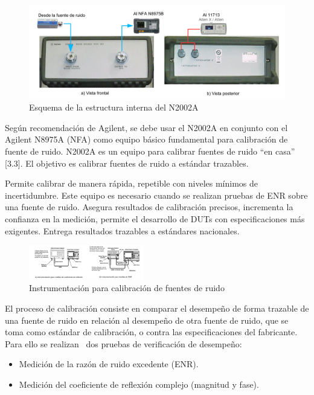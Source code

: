 \begin{figure}[h!]
	\centering
	\includegraphics[width=16cm]{Imagenes/InterfacesElectricasN2002.pdf}
	\caption{Esquema de la estructura interna del N2002A}			
	\label{Fig:InterfacesElectricasN2002}
\end{figure}

Según recomendación de Agilent, se debe usar el N2002A en conjunto con el Agilent N8975A (NFA) como equipo básico fundamental para calibración de fuente de ruido. N2002A es un equipo para calibrar fuentes de ruido “en casa” [3.3]. El objetivo es calibrar fuentes de ruido a estándar trazables.

Permite calibrar de manera rápida, repetible con niveles mínimos de incertidumbre. Este equipo es necesario cuando se	realizan pruebas de ENR sobre una fuente de ruido. Asegura resultados de calibración precisos, incrementa la confianza en la medición, permite el desarrollo de DUTs con especificaciones más exigentes. Entrega resultados trazables a 	estándares nacionales.

\begin{figure}
	\centering
	\includegraphics[width=5cm]{Imagenes/InstrumentacionCalibracionN2002.pdf}
	\caption{Instrumentación para calibración de fuentes de ruido}
	\label{Fig:InstrumentacionCalibracionN2002}
\end{figure}

El proceso de calibración consiste en comparar el desempeño de forma trazable de una fuente de ruido en relación al desempeño de otra fuente de ruido, que se toma como estándar de calibración, o contra las especificaciones del fabricante. Para ello se realizan \ dos pruebas de verificación de desempeño: 

\begin{itemize}
\item Medición de la razón de ruido excedente (ENR).
\item Medición del coeficiente de reflexión complejo (magnitud y fase). 
\end{itemize}

